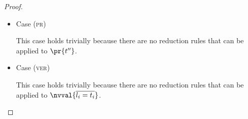 \begin{proof}
\begin{itemize}
\item Case (\textsc{pr})
\begin{center}
    \begin{minipage}{.35\linewidth}
    \end{minipage}
\end{center}
This case holds trivially because there are no reduction rules that can be applied to $\pr{t''}$.
\\

\item Case (\textsc{ver})
\begin{center}
    \begin{minipage}{.65\linewidth}
    \end{minipage}
\end{center}
This case holds trivially because there are no reduction rules that can be applied to $\nvval{\overline{l_i=t_i}}$.
\\


\end{itemize}
\end{proof}
